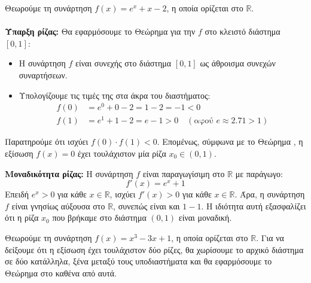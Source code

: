 \lysh
Θεωρούμε τη συνάρτηση $f(x) = e^x + x - 2$, η οποία ορίζεται στο $\mathbb{R}$.
\\\\\textbf{Ύπαρξη ρίζας:} Θα εφαρμόσουμε το Θεώρημα  για την $f$ στο κλειστό διάστημα $[0, 1]$:
\begin{itemize}
    \item Η συνάρτηση $f$ είναι συνεχής στο διάστημα $[0, 1]$ ως άθροισμα συνεχών συναρτήσεων.
    \item Υπολογίζουμε τις τιμές της στα άκρα του διαστήματος:
    \begin{align*}
        f(0) &= e^0 + 0 - 2 = 1 - 2 = -1 < 0 \\
        f(1) &= e^1 + 1 - 2 = e - 1 > 0 \quad (\text{αφού } e \approx 2.71 > 1)
    \end{align*}
\end{itemize}
Παρατηρούμε ότι ισχύει $f(0) \cdot f(1) < 0$. 
Επομένως, σύμφωνα με το Θεώρημα , η εξίσωση $f(x) = 0$ έχει τουλάχιστον μία ρίζα $x_0 \in (0, 1)$.

\textbf{Μοναδικότητα ρίζας:} Η συνάρτηση $f$ είναι παραγωγίσιμη στο $\mathbb{R}$ με παράγωγο:
\[ f'(x) = e^x + 1 \]
Επειδή $e^x > 0$ για κάθε $x \in \mathbb{R}$, ισχύει $f'(x) > 0$ για κάθε $x \in \mathbb{R}$. 
Άρα, η συνάρτηση $f$ είναι γνησίως αύξουσα στο $\mathbb{R}$, συνεπώς είναι και $1-1$. 
Η ιδιότητα αυτή εξασφαλίζει ότι η ρίζα $x_0$ που βρήκαμε στο διάστημα $(0, 1)$ είναι μοναδική.\\


\lysh
Θεωρούμε τη συνάρτηση $f(x) = x^3 - 3x + 1$, η οποία ορίζεται στο $\mathbb{R}$. 
Για να δείξουμε ότι η εξίσωση έχει τουλάχιστον δύο ρίζες, θα χωρίσουμε το αρχικό διάστημα σε δύο κατάλληλα, ξένα μεταξύ τους υποδιαστήματα και θα εφαρμόσουμε το Θεώρημα  στο καθένα από αυτά.

